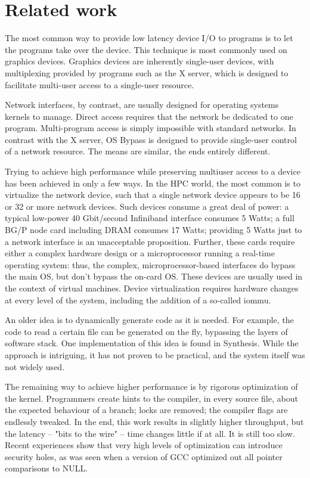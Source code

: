 \documentclass[a4,10pt,preprint]{sigplanconf}
\begin{document}
\section{Related work}
The most common way to provide low latency device I/O 
to programs is to let the programs take over the device. 
This technique is most commonly used on graphics devices. Graphics devices are inherently single-user devices, with multiplexing 
provided by programs such as the X server, which is designed to facilitate multi-user access to a single-user resource. 

Network interfaces, by contrast, are usually designed for operating systems kernels to manage. 
Direct access requires that the network be dedicated to one program. Multi-program access is simply impossible with 
standard networks. In contrast with the X server, OS Bypass is designed to provide single-user control of a network resource. 
The means are similar, the ends entirely different. 

Trying to achieve high performance while preserving multiuser access
to a device has been achieved in only a few ways. In the HPC world,
the most common is to virtualize the network device, such that a
single network device appears to be 16 or 32 or more network
devices. Such devices consume a great deal of power: a typical
low-power 40 Gbit/second Infiniband interface consumes 5 Watts; a full
BG/P node card including DRAM consumes 17 Watts; providing 5 Watts
just to a network interface is an unacceptable proposition. Further,
these cards require either a complex hardware design or a
microprocessor running a real-time operating system: thus, the
complex, microprocessor-based interfaces do bypass the main OS, but
don't bypass the on-card OS\cite{Boden95myrinet}.  These devices are
usually used in the context of virtual machines. Device virtualization
requires hardware changes at every level of the system, including the
addition of a so-called iommu\cite{iommu}.

An older idea is to dynamically generate code as it is needed. For example, the code to read a certain file can 
be generated on the fly, bypassing the layers of software stack. One implementation of this idea 
is found in   Synthesis\cite{synthesis}. While the approach is intriguing, 
it has not proven to be practical, and the system itself was not widely used. 

The remaining way to achieve higher performance is by rigorous optimization of the kernel. Programmers
create hints to the compiler, in every source file, about the expected behaviour of a branch; locks are removed; 
the compiler flags are endlessly tweaked. In the end, this work results in slightly higher throughput, but the 
latency -- "bits to the wire" -- time changes little if at all. It is still too slow. Recent experiences show that 
very high levels  
of optimization can introduce security holes, as was seen when a version of GCC 
optimized out all pointer comparisons to 
NULL. 
\end{document}
